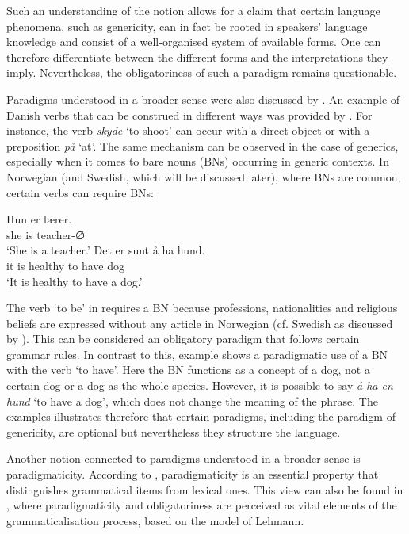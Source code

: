 \documentclass[output=paper]{langsci/langscibook}
\begin{document}
Such an understanding of the notion allows for a claim that certain language phenomena, such as genericity, can in fact be rooted in speakers' language knowledge and consist of a well-organised system of available forms. One can therefore differentiate between the different forms and the interpretations they imply. Nevertheless, the obligatoriness of such a paradigm remains questionable.

Paradigms understood in a broader sense were also discussed by \citet{Nørgård-Sørensen2011}. An example of Danish verbs that can be construed in different ways was provided by \citet[72--73]{Nørgård-Sørensen2011}. For instance, the verb \textit{skyde} `to shoot' can occur with a direct object or with a preposition \textit{på} `at'. The same mechanism can be observed in the case of generics, especially when it comes to bare nouns (BNs) occurring in generic contexts. In Norwegian (and Swedish, which will be discussed later), where BNs are common, certain verbs can require BNs:

\ea
\label{ex:norwegian-gen1}
	\gll Hun er lærer. \\
		 she is teacher-∅ \\
	\glt `She is a teacher.'
\ex \label{ex:norwegian-gen2} 
	\gll Det er sunt å ha hund. \\
		 it is healthy to have dog \\
	\glt `It is healthy to have a dog.'
\z

The verb `to be' in  requires a BN because professions, nationalities and religious beliefs are expressed without any article in Norwegian (cf. Swedish as discussed by \citealp{Pettersson1976}). This can be considered an obligatory paradigm that follows certain grammar rules. In contrast to this, example  shows a paradigmatic use of a BN with the verb `to have'. Here the BN functions as a concept of a dog, not a certain dog or a dog as the whole species. However, it is possible to say \textit{å ha en hund} `to have a dog', which does not change the meaning of the phrase. The examples illustrates therefore that certain paradigms, including the paradigm of genericity, are optional but nevertheless they structure the language.

\begin{sloppypar}
Another notion connected to paradigms understood in a broader sense is paradigmaticity. According to \citet[447]{Diewald2009}, paradigmaticity is an essential property that distinguishes grammatical items from lexical ones. This view can also be found in \citet{DiewaldSmirnova2010}, where paradigmaticity and obligatoriness are perceived as vital elements of the grammaticalisation process, based on the model of Lehmann.
\end{sloppypar}
\end{document}
